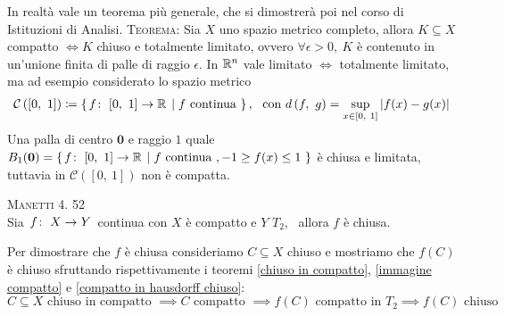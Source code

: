In realtà vale un teorema più generale, che si dimostrerà poi nel corso di Istituzioni di Analisi.\newline
\textsc{Teorema:} Sia $X$ uno spazio metrico completo, allora $K\subseteq X$ compatto $\iff K$ chiuso e totalmente limitato, ovvero $\forall\epsilon >0, \ K$ è contenuto in un'unione finita di palle di raggio $\epsilon$.\newline 
In $\mathbb{R}^n$ vale limitato $\iff$ totalmente limitato, ma ad esempio considerato lo spazio metrico 
	\begin{gather*}
		\mathcal{C}\left( [0, \ 1] \right) \coloneqq \left\{ \funz f {[0,\ 1]} \realset \mid f \text{ continua } \right\},  \ \ \text{con } \mvf{d}{f}{g} =\sup_{x\in [0, \ 1]} |f(x)-g(x)|
	\end{gather*}
Una palla di centro $\mathbf{0}$ e raggio $1$ quale $B_1(\mathbf{0})=\left\{ \funz f {[0,\ 1]} \realset \mid f \text{ continua }, -1\geq f(x) \leq 1 \ \right\}$ è chiusa e limitata, tuttavia in $	\mathcal{C}\left( [0, \ 1] \right)$ non è compatta.\newline

\begin{theorema} \textsc{Manetti 4. 52} \label{da compatto in T_2 è chiuso} \\
	Sia $\funz f X Y$ continua con $X$ è compatto e $Y$ $T_2$, \ allora $f$ è chiusa.
\end{theorema}
\begin{demonstration}
	Per dimostrare che $f$ è chiusa consideriamo $C\subseteq X$ chiuso e mostriamo che $f(C)$ è chiuso sfruttando rispettivamente i teoremi \ref{chiuso in compatto}, \ref{immagine compatto} e \ref{compatto in hausdorff chiuso}:
		\begin{equation*}
			C\subseteq X \text{ chiuso in compatto } \implies C \text{ compatto } \implies f(C) \text{ compatto in } T_2 \implies f(C) \text{ chiuso}
		\end{equation*}
\end{demonstration}

